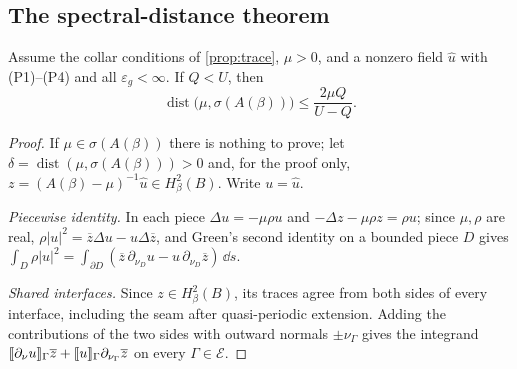 \subsection{The spectral-distance theorem}\label{sec:theorem}
\begin{theorem}\label{thm:distance}
Assume the collar conditions of \cref{prop:trace}, $\mu>0$, and a nonzero field
$\widehat u$ with (P1)--(P4) and all $\varepsilon_g<\infty$. If $Q<U$, then
\[
  \operatorname{dist}\bigl(\mu,\sigma(A(\beta))\bigr)\le\frac{2\mu Q}{U-Q}.
\]
\end{theorem}

\begin{proof}
If $\mu\in\sigma(A(\beta))$ there is nothing to prove; let
$\delta=\operatorname{dist}(\mu,\sigma(A(\beta)))>0$ and, for the proof only,
$z=(A(\beta)-\mu)^{-1}\widehat u\in H^2_\beta(B)$. Write $u=\widehat u$.

\emph{Piecewise identity.} In each piece $\Delta u=-\mu\rho u$ and
$-\Delta z-\mu\rho z=\rho u$; since $\mu,\rho$ are real,
$\rho|u|^2=\overline z\Delta u-u\Delta\overline z$, and Green's second identity on
a bounded piece $D$ gives $\int_D\rho|u|^2=\int_{\partial D}(\overline z\,
\partial_{\nu_D}u-u\,\partial_{\nu_D}\overline z)\,\dd s$.

\emph{Shared interfaces.} Since $z\in H^2_\beta(B)$, its traces agree from both
sides of every interface, including the seam after quasi-periodic extension.
Adding the contributions of the two sides with outward normals $\pm\nu_\Gamma$
gives the integrand $\llbracket \partial_\nu u\rrbracket_\Gamma\overline z+\llbracket u\rrbracket_\Gamma
\partial_{\nu_\Gamma}\overline z$ on every $\Gamma\in\mathscr E$.


\end{proof}
